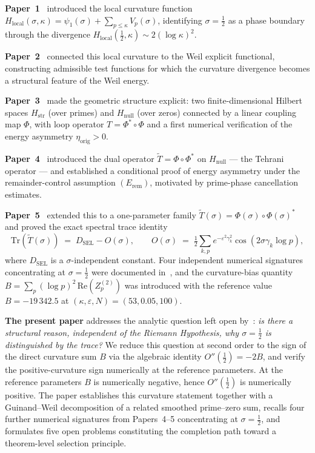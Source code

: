 \documentclass[11pt]{article}
\newcommand{\Hstr}{H_{\mathrm{str}}}
\newcommand{\Hnull}{H_{\mathrm{null}}}
\newcommand{\etaorig}{\eta_{\mathrm{orig}}}
\newcommand{\Tt}{\widetilde{T}}
\newcommand{\Hlocal}{H_{\mathrm{local}}}
\newcommand{\DSEL}{D_{\mathrm{SEL}}}
\begin{document}
\textbf{Paper~1}~\cite{Paper1} introduced the local curvature function
$\Hlocal(\sigma,\kappa)=\psi_1(\sigma)+\sum_{p\le\kappa}V_p(\sigma)$, identifying
$\sigma=\tfrac12$ as a phase boundary through the divergence
$\Hlocal(\tfrac12,\kappa)\sim 2(\log\kappa)^2$.

\textbf{Paper~2}~\cite{Paper2} connected this local curvature to the
Weil explicit functional, constructing admissible test functions
for which the curvature divergence becomes a structural feature of
the Weil energy.

\textbf{Paper~3}~\cite{Paper3} made the geometric structure explicit:
two finite-dimensional Hilbert spaces $\Hstr$ (over primes) and
$\Hnull$ (over zeros) connected by a linear coupling map $\Phi$, with
loop operator $T=\Phi^*\circ\Phi$ and a first numerical verification of the
energy asymmetry $\etaorig>0$.

\textbf{Paper~4}~\cite{Paper4} introduced the dual operator
$\Tt=\Phi\circ\Phi^*$ on $\Hnull$ --- the Tehrani operator --- and
established a conditional proof of energy asymmetry under the
remainder-control assumption $(E_{\mathrm{rem}})$, motivated by
prime-phase cancellation estimates.

\textbf{Paper~5}~\cite{Paper5} extended this to a one-parameter
family $\Tt(\sigma)=\Phi(\sigma)\circ\Phi(\sigma)^*$ and proved the
exact spectral trace identity
\[
\mathrm{Tr}(\Tt(\sigma)) \;=\; \DSEL - O(\sigma),
\qquad
O(\sigma) \;=\; \tfrac12\sum_{k,p} e^{-\varepsilon^2\gamma_k^2}
                \cos(2\sigma\gamma_k\log p),
\]
where $\DSEL$ is a $\sigma$-independent constant.
Four independent numerical signatures concentrating at $\sigma=\tfrac12$
were documented in~\cite{Paper4,Paper5}, and the curvature-bias quantity
$B=\sum_p(\log p)^2\,\mathrm{Re}(Z_p^{(2)})$ was introduced with the reference
value $B=-19\,342.5$ at $(\kappa,\varepsilon,N)=(53,0.05,100)$.

\textbf{The present paper} addresses the analytic question left open
by~\cite{Paper5}: \emph{is there a structural reason, independent of
the Riemann Hypothesis, why $\sigma=\tfrac12$ is distinguished by the
trace?}
We reduce this question at second order to the sign of the direct
curvature sum $B$ via the algebraic identity $O''(\tfrac12)=-2B$,
and verify the positive-curvature sign numerically at the reference
parameters.
At the reference parameters $B$ is numerically negative, hence
$O''(\tfrac12)$ is numerically positive.
The paper establishes this curvature statement together with a
Guinand--Weil decomposition of a related smoothed prime--zero sum,
recalls four further numerical signatures from Papers~4--5 concentrating
at $\sigma=\tfrac12$,
and formulates five open problems constituting the completion path
toward a theorem-level selection principle.
\end{document}
